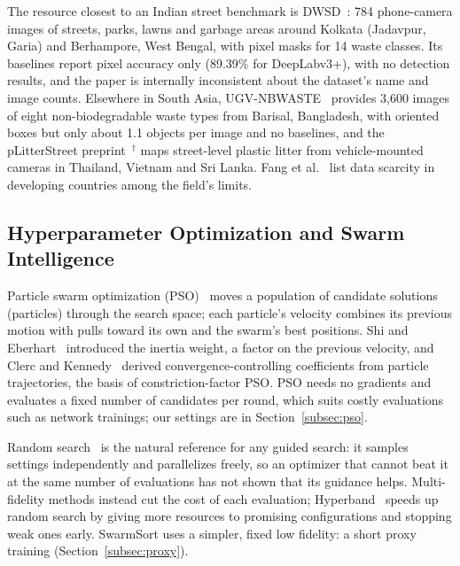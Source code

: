 The resource closest to an Indian street benchmark is DWSD~\cite{ali2025dwsd}: 784 phone-camera images of streets, parks, lawns and garbage areas around Kolkata (Jadavpur, Garia) and Berhampore, West Bengal, with pixel masks for 14 waste classes. Its baselines report pixel accuracy only (89.39\% for DeepLabv3+), with no detection results, and the paper is internally inconsistent about the dataset's name and image counts. Elsewhere in South Asia, UGV-NBWASTE~\cite{isalm2025ugvnbwaste} provides 3,600 images of eight non-biodegradable waste types from Barisal, Bangladesh, with oriented boxes but only about 1.1 objects per image and no baselines, and the pLitterStreet preprint~\cite{mandhati2024plitterstreet}$^{\dagger}$ maps street-level plastic litter from vehicle-mounted cameras in Thailand, Vietnam and Sri Lanka. Fang et al.~\cite{fang2023artificial} list data scarcity in developing countries among the field's limits.

\subsection{Hyperparameter Optimization and Swarm Intelligence}
\label{subsec:rw-hpo}

Particle swarm optimization (PSO)~\cite{kennedy1995particle} moves a population of candidate solutions (particles) through the search space; each particle's velocity combines its previous motion with pulls toward its own and the swarm's best positions. Shi and Eberhart~\cite{shi1998modified} introduced the inertia weight, a factor on the previous velocity, and Clerc and Kennedy~\cite{clerc2002particle} derived convergence-controlling coefficients from particle trajectories, the basis of constriction-factor PSO. PSO needs no gradients and evaluates a fixed number of candidates per round, which suits costly evaluations such as network trainings; our settings are in Section~\ref{subsec:pso}.

Random search~\cite{bergstra2012random} is the natural reference for any guided search: it samples settings independently and parallelizes freely, so an optimizer that cannot beat it at the same number of evaluations has not shown that its guidance helps. Multi-fidelity methods instead cut the cost of each evaluation; Hyperband~\cite{li2018hyperband} speeds up random search by giving more resources to promising configurations and stopping weak ones early. SwarmSort uses a simpler, fixed low fidelity: a short proxy training (Section~\ref{subsec:proxy}).

